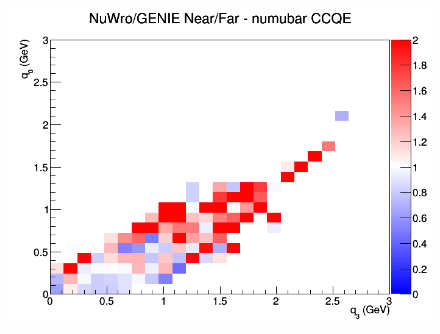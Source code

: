 \begin{figure}[h]
\endminipage
{}
\includegraphics[width=\linewidth]{eff_q0_q3/GAr/ratios/CCQE_NuWro_GENIE_numubar_NF_q3_q0.png}
\endminipage
\newline
\end{figure}
\clearpage

